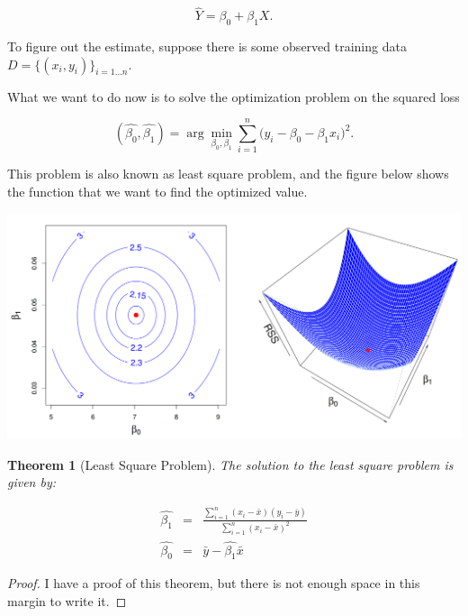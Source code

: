 \documentclass{article}
\theoremstyle{MyNonumberplain}
\theoremstyle{break}
\newtheorem*{proof}{Proof. }
\newcommand{\bt}[1]{\beta_{#1}}
\newcommand\ddfrac[2]{\frac{\displaystyle #1}{\displaystyle #2}}
\theoremstyle{break}
\newtheorem{theorem}{Theorem}[section]
\theoremstyle{break}
\theoremstyle{break}
\begin{document}
$$\hat{Y}=\bt{0}+\bt{1}X.$$

To figure out the estimate, suppose there is some observed training data $D=\biggl\{(x_i,y_i)\biggr\}_{i=1...n}$.

What we want to do now is to solve the optimization problem on the squared loss

$$(\hat{\bt{0}},\hat{\bt{1}})=\arg\min_{\bt{0},\bt{1}}\sum_{i=1}^n\bigl(y_i-\bt{0}-\bt{1}x_i\bigr)^2.$$

This problem is also known as least square problem, and the figure below shows the function that we want to find the optimized value.

\begin{center}
    \includegraphics*[scale=0.25]{Images/img7.png}
\end{center}

\begin{thmbox}
    \begin{theorem}[Least Square Problem]
        The solution to the least square problem is given by: 
    \end{theorem}
        \begin{eqnarray*}
            \hat{\bt{1}}&=& \ddfrac{\sum_{i=1}^n(x_i-\bar{x})(y_i-\bar{y})}{\sum_{i=1}^n(x_i-\bar{x})^2}\\
            \hat{\bt{0}}&=& \bar{y}- \hat{\bt{1}}\bar{x}
        \end{eqnarray*}
        \begin{prfbox}
            \begin{proof}
                I have a proof of this theorem, but there is not enough space in this margin to write it. 
            \end{proof}
        \end{prfbox}
\end{thmbox}
\end{document}
